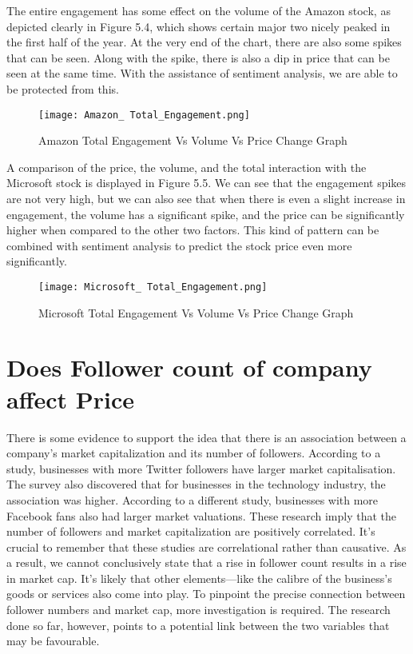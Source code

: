 \documentclass[12pt, a4paper,twoside]{report}
\theoremstyle{plain} %
\theoremstyle{definition} %
\theoremstyle{remark} %
\numberwithin{equation}{chapter}
\begin{document}
    The entire engagement has some effect on the volume of the Amazon stock, as depicted clearly in Figure 5.4, which shows certain major two nicely peaked in the first half of the year. At the very end of the chart, there are also some spikes that can be seen. Along with the spike, there is also a dip in price that can be seen at the same time. With the assistance of sentiment analysis, we are able to be protected from this.
    \begin{figure}
        \centering
        \texttt{[image: Amazon\_ Total\_Engagement.png]}
        \caption{Amazon Total Engagement Vs Volume Vs Price Change Graph}
        \label{fig:enter-label4}
    \end{figure}

    A comparison of the price, the volume, and the total interaction with the Microsoft stock is displayed in Figure 5.5. We can see that the engagement spikes are not very high, but we can also see that when there is even a slight increase in engagement, the volume has a significant spike, and the price can be significantly higher when compared to the other two factors. This kind of pattern can be combined with sentiment analysis to predict the stock price even more significantly.
    \begin{figure}
        \centering
        \texttt{[image: Microsoft\_ Total\_Engagement.png]}
        \caption{Microsoft Total Engagement Vs Volume Vs Price Change Graph}
        \label{fig:enter-label5}
    \end{figure}

    \section{Does Follower count of company affect Price}
    
    There is some evidence to support the idea that there is an association between a company's market capitalization and its number of followers.  According to a study, businesses with more Twitter followers have larger market capitalisation. The survey also discovered that for businesses in the technology industry, the association was higher. According to a different study, businesses with more Facebook fans also had larger market valuations. These research imply that the number of followers and market capitalization are positively correlated. It's crucial to remember that these studies are correlational rather than causative. As a result, we cannot conclusively state that a rise in follower count results in a rise in market cap. It's likely that other elements---like the calibre of the business's goods or services also come into play. To pinpoint the precise connection between follower numbers and market cap, more investigation is required. The research done so far, however, points to a potential link between the two variables that may be favourable.
\end{document}
